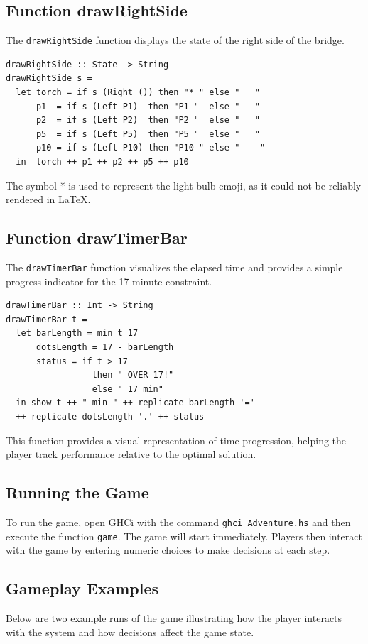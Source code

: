 \documentclass[a4paper,12pt]{report}
\begin{document}
\subsection{Function drawRightSide}

The \texttt{drawRightSide} function displays the state of the right side of the bridge.

\begin{verbatim}
drawRightSide :: State -> String
drawRightSide s =
  let torch = if s (Right ()) then "* " else "   "
      p1  = if s (Left P1)  then "P1 "  else "   "
      p2  = if s (Left P2)  then "P2 "  else "   "
      p5  = if s (Left P5)  then "P5 "  else "   "
      p10 = if s (Left P10) then "P10 " else "    "
  in  torch ++ p1 ++ p2 ++ p5 ++ p10
\end{verbatim}
The symbol * is used to represent the light bulb emoji, as it could not be reliably rendered in LaTeX.
\subsection{Function drawTimerBar}

The \texttt{drawTimerBar} function visualizes the elapsed time and provides a simple progress indicator for the 17-minute constraint.

\begin{verbatim}
drawTimerBar :: Int -> String
drawTimerBar t = 
  let barLength = min t 17
      dotsLength = 17 - barLength
      status = if t > 17 
                 then " OVER 17!"
                 else " 17 min"
  in show t ++ " min " ++ replicate barLength '='
  ++ replicate dotsLength '.' ++ status
\end{verbatim}

This function provides a visual representation of time progression, helping the player track performance relative to the optimal solution.
\subsection{Running the Game}
To run the game, open GHCi with the command \texttt{ghci Adventure.hs} and then execute the function \texttt{game}. The game will start immediately. Players then interact with the game by entering numeric choices to make decisions at each step.
\subsection{Gameplay Examples}
Below are two example runs of the game illustrating how the player interacts with the system and how decisions affect the game state.
\end{document}

